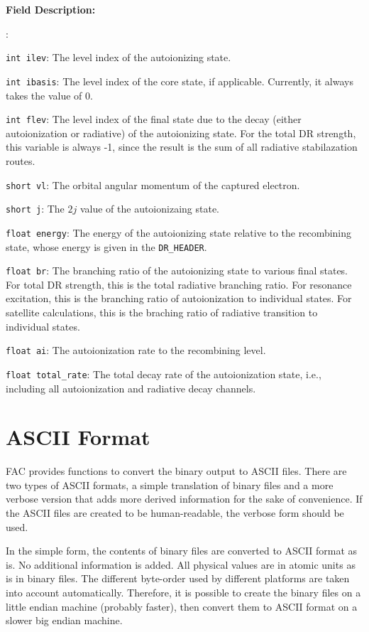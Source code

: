 \documentclass[twoside,letterpaper]{refrep}
\newenvironment{dbdesc}{\textbf{Field Description:} \begin{list}
	{:}{\setlength{\labelwidth}{2in}
	   \setlength{\leftmargin}{2in}
	   \setlength{\labelsep}{0.1in}
	   \setlength{\rightmargin}{0.2in}}}
	{\end{list}}
\begin{document}
\begin{dbdesc}
\item[\texttt{int ilev}:] The level index of the autoionizing state.
\item[\texttt{int ibasis}:] The level index of the core state, if
applicable. Currently, it always takes the value of 0.
\item[\texttt{int flev}:] The level index of the final state due to the decay
(either autoionization or radiative) of the autoionizing state. For the total
DR strength, this variable is always -1, since the result is the sum of all
radiative stabilazation routes.
\item[\texttt{short vl}:] The orbital angular momentum of the captured
electron. 
\item[\texttt{short j}:] The $2j$ value of the autoionizaing state.
\item[\texttt{float energy}:] The energy of the autoionizing state relative to
the recombining state, whose energy is given in the \texttt{DR\_HEADER}.
\item[\texttt{float br}:] The branching ratio of the autoionizing state to
various final states. For total DR strength, this is the total radiative
branching ratio. For resonance excitation, this is the branching ratio of
autoionization to individual states. For satellite calculations, this is the
braching ratio of radiative transition to individual states.
\item[\texttt{float ai}:] The autoionization rate to the recombining level.
\item[\texttt{float total\_rate}:] The total decay rate of the autoionization
state, i.e., including all autoionization and radiative decay channels.
\end{dbdesc}

\section{ASCII Format}
FAC provides functions to convert the binary output to ASCII files. There are
two types of ASCII formats, a simple translation of binary files and a more
verbose version that adds more derived information for the sake of
convenience. If the ASCII files are created to be human-readable, the
verbose form should be used.

In the simple form, the contents of binary files are converted to ASCII format
as is. No additional information is added. All physical values are in atomic
units as is in binary files. The different byte-order used by different
platforms are taken into account automatically. Therefore, it is possible to
create the binary files on a little endian machine (probably faster), then
convert them to ASCII format on a slower big endian machine.
\end{document}
